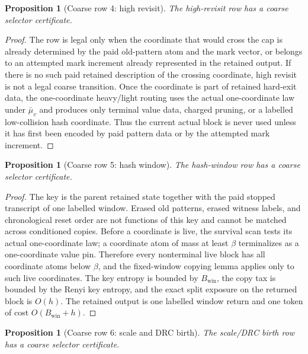 \documentclass[11pt]{article}
\newtheorem{proposition}[theorem]{Proposition}
\theoremstyle{remark}
\newcommand{\win}{\mathrm{win}}
\begin{document}
\begin{proposition}[Coarse row 4: high revisit]\label{prop:coarse-row-high-revisit}
The high-revisit row has a coarse selector certificate.
\end{proposition}

\begin{proof}
The row is legal only when the coordinate that would cross the cap is already determined by the paid old-pattern atom and the mark vector, or belongs to an attempted mark increment already represented in the retained output.  If there is no such paid retained description of the crossing coordinate, high revisit is not a legal coarse transition.  Once the coordinate is part of retained hard-exit data, the one-coordinate heavy/light routing uses the actual one-coordinate law under $\bar\mu_v$ and produces only terminal value data, charged pruning, or a labelled low-collision hash coordinate.  Thus the current actual block is never used unless it has first been encoded by paid pattern data or by the attempted mark increment.
\end{proof}

\begin{proposition}[Coarse row 5: hash window]\label{prop:coarse-row-hash}
The hash-window row has a coarse selector certificate.
\end{proposition}

\begin{proof}
The key is the parent retained state together with the paid stopped transcript of one labelled window.  Erased old patterns, erased witness labels, and chronological reset order are not functions of this key and cannot be matched across conditioned copies.  Before a coordinate is live, the survival scan tests its actual one-coordinate law; a coordinate atom of mass at least $\beta$ terminalizes as a one-coordinate value pin.  Therefore every nonterminal live block has all coordinate atoms below $\beta$, and the fixed-window copying lemma applies only to such live coordinates.  The key entropy is bounded by $B_{\win}$, the copy tax is bounded by the Renyi key entropy, and the exact split exposure on the returned block is $O(h)$.  The retained output is one labelled window return and one token of cost $O(B_{\win}+h)$.
\end{proof}

\begin{proposition}[Coarse row 6: scale and DRC birth]\label{prop:coarse-row-scale-drc}
The scale/DRC birth row has a coarse selector certificate.
\end{proposition}
\end{document}
